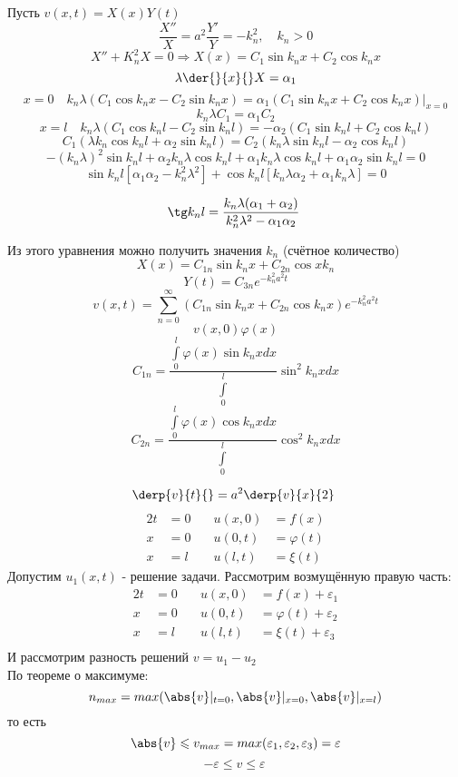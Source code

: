 Пусть $v(x, t) = X(x) Y(t)$\\
	

\[
	\frac{X''}{X} = a^2 \frac{Y'}{Y} = - k_n^2, \quad k_n > 0 
\]
\[
	X'' + K_n^2 X = 0 \Rightarrow X(x) = C_1 \sin k_n x + C_2 \cos k_n x
\]
\[
	\lambda \der{}{x}{} X = \alpha_1
\]
\[
	x = 0 \quad k_n \lambda (C_1 \cos k_n x - C_2 \sin k_n x) = \alpha_1 (C_1 \sin k_n x + C_2 \cos k_n x) |_{x = 0}
\]
\[
	k_n \lambda  C_1 = \alpha_1 C_2
\]
\[
	x = l \quad k_n \lambda ( C_1 \cos k_n l - C_2 \sin k_n l) = - \alpha_2 (C_1 \sin k_n l + C_2 \cos k_n l)
\]
\[
	C_1(\lambda k_n \cos k_nl + \alpha_2 \sin k_n l) = C_2 (k_n \lambda \sin k_nl - \alpha_2 \cos k_n l)
\]
\[
	- (k_n \lambda )^2 \sin k_n l + \alpha_2  k_n \lambda \cos k_n l + \alpha_1 k_n \lambda \cos k_n l + \alpha_1 \alpha_2 \sin k_n l = 0
\]
\[
	\sin k_n l [\alpha_1 \alpha_2 - k_n^2 \lambda^2] + \cos k_n l [k_n \lambda \alpha_2 + \alpha_1 k_n \lambda] = 0
\]

\[
	\tg k_n l = \frac{k_n \lambda (\alpha_1 + \alpha_2)}{k_n^2 \lambda^2 - \alpha_1 \alpha_2}\
\]

Из этого уравнения можно получить значения $k_n$ (счётное количество)\\
\[
	X(x) = C_{1n} \sin k_n x + C_{2n} \cos x k_n
\]
\[
	Y(t) = C_{3n} e^{- k_n^2 a^2 t}
\]
\[
	v (x, t) = \sum\limits_{n = 0}^{\infty} (C_{1n} \sin k_n x + C_{2n} \cos k_n x) e^{-k_n^2 a^2 t}
\]
\[
	v(x, 0) \varphi(x)
\]
\[
	C_{1n} = \frac{\int\limits_0^l \varphi(x) \sin k_n x dx}{\int\limits_0^l} \sin^2 k_n x dx
\]
\[
	C_{2n} = \frac{\int\limits_0^l \varphi(x) \cos k_n x dx}{\int\limits_0^l} \cos^2 k_n x dx
\]

\[
	\derp{v}{t}{} = a^2 \derp{v}{x}{2}\
\]
	\begin{alignat*}{2}
		t &= 0 &\quad u(x, 0) &= f(x)\\
		x &= 0 &\quad u(0, t) &= \varphi(t)\\
		x &= l &\quad u(l, t) &= \xi(t)			
	\end{alignat*}
Допустим $u_1 (x, t)$ - решение задачи.
Рассмотрим возмущённую правую часть:\\
	\begin{alignat*}{2}
		t &= 0 &\quad u(x, 0) &= f(x) + \varepsilon_1\\
		x &= 0 &\quad u(0, t) &= \varphi(t) + \varepsilon_2\\
		x &= l &\quad u(l, t) &= \xi(t) + \varepsilon_3\\
	\end{alignat*}
И рассмотрим разность решений $v = u_1 - u_2$\\
По теореме о максимуме: 
\[
	n_{max} = max(\abs{v}|_{t=0}, \abs{v}|_{x=0}, \abs{v}|_{x=l})
\]
то есть 
\[
	\abs{v} \leqslant v_{max} = max(\varepsilon_1, \varepsilon_2, \varepsilon_3) = \varepsilon
\]
\[
	- \varepsilon \leqslant v \leqslant \varepsilon\
\]
